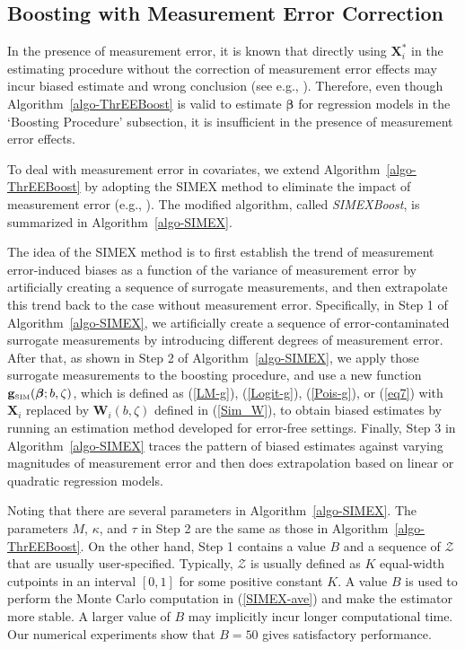 

\subsection{Boosting with Measurement Error Correction}

In the presence of measurement error, it is known that directly using $\mathbf{X}_i^\ast$ in the estimating procedure without the correction of measurement error effects may incur biased estimate and wrong conclusion ({see} e.g., \citealp{Carroll:2006}). Therefore, even though Algorithm~\ref{algo-ThrEEBoost} is valid to estimate $\boldsymbol{\beta}$ for regression models in the `Boosting Procedure' subsection, it {is insufficient in the presence of} measurement error effects. 

To deal with measurement error in covariates, we extend Algorithm~\ref{algo-ThrEEBoost} by adopting the SIMEX method to eliminate the impact of measurement error (e.g., \citealp{ChenYi:2021}). The modified algorithm, called {\it SIMEXBoost}, is summarized in Algorithm~\ref{algo-SIMEX}. 

The idea of the SIMEX method is to first establish the trend of measurement error-induced biases as a function of the variance of  measurement error by artificially creating a sequence of surrogate measurements, and then extrapolate this trend back to the case without measurement error. Specifically, in Step 1 of Algorithm~\ref{algo-SIMEX}, we artificially create a sequence of error-contaminated surrogate measurements by introducing different degrees of measurement error. After that, as shown in Step 2 of Algorithm~\ref{algo-SIMEX}, we apply those surrogate measurements to the boosting procedure, and use a new function $\mathbf{g}_\text{\tiny SIM}(\boldsymbol{\beta};b,\zeta)$, which is defined as (\ref{LM-g}), (\ref{Logit-g}), (\ref{Pois-g}), or (\ref{eq7}) with $\mathbf{X}_i$ replaced by $\mathbf{W}_i \left(b,\zeta\right)$ defined in (\ref{Sim_W}), to obtain biased estimates by running an estimation method developed for error-free settings. Finally, Step 3 in Algorithm~\ref{algo-SIMEX} traces the  pattern of biased estimates against varying magnitudes of measurement error and then does extrapolation based on linear or quadratic regression models. 

Noting that there are several parameters in Algorithm~\ref{algo-SIMEX}. The parameters $M$, $\kappa$, and $\tau$ in Step 2 are the same as those in Algorithm~\ref{algo-ThrEEBoost}. On the other hand, Step 1 contains a value $B$ and a sequence of $\mathcal{Z}$ that are usually user-specified. Typically, $\mathcal{Z}$ is usually defined as $K$ equal-width cutpoints in an interval $[0,1]$ for some positive constant $K$. A value $B$ is used to perform the Monte Carlo computation in (\ref{SIMEX-ave}) and make the estimator more stable. A larger value of $B$ may implicitly incur longer computational time. Our numerical experiments show that $B=50$ gives satisfactory performance.



